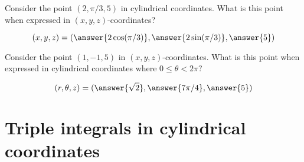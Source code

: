 \documentclass{ximera}
\begin{document}
\begin{question}
  Consider the point $(2, \pi/3,5)$ in cylindrical coordinates. What is
  this point when expressed in $(x,y,z)$-coordinates?
  \begin{prompt}
    \[
    (x,y,z) = \left(\answer{2\cos(\pi/3)}, \answer{2 \sin(\pi/3)},\answer{5}\right)
    \]
  \end{prompt}
  \begin{question}
    Consider the point $(1, -1,5)$ in $(x,y,z)$-coordinates. What is
    this point when expressed in cylindrical coordinates where
    $0\le\theta<2\pi$?
    \begin{prompt}
      \[
      (r,\theta,z) = (\answer{\sqrt{2}}, \answer{7\pi/4},\answer{5})
      \]
    \end{prompt}
  \end{question}
\end{question}

\section{Triple integrals in cylindrical coordinates}
\end{document}
